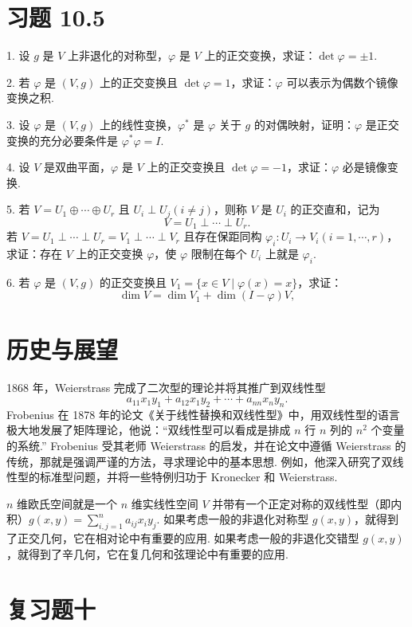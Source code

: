 \documentclass[UTF8,12pt,a4paper,fontset=fandol]{ctexart}
\begin{document}
\section*{习题 10.5}

1. 设 $g$ 是 $V$ 上非退化的对称型，$\varphi$ 是 $V$ 上的正交变换，求证：$\det\varphi=\pm1$.

2. 若 $\varphi$ 是 $(V,g)$ 上的正交变换且 $\det\varphi=1$，求证：$\varphi$ 可以表示为偶数个镜像变换之积.

3. 设 $\varphi$ 是 $(V,g)$ 上的线性变换，$\varphi^*$ 是 $\varphi$ 关于 $g$ 的对偶映射，证明：$\varphi$ 是正交变换的充分必要条件是 $\varphi^*\varphi=I$.

4. 设 $V$ 是双曲平面，$\varphi$ 是 $V$ 上的正交变换且 $\det\varphi=-1$，求证：$\varphi$ 必是镜像变换.

5. 若 $V=U_1\oplus\cdots\oplus U_r$ 且 $U_i\perp U_j(i\ne j)$，则称 $V$ 是 $U_i$ 的正交直和，记为
\[
  V=U_1\perp\cdots\perp U_r.
\]
若 $V=U_1\perp\cdots\perp U_r=V_1\perp\cdots\perp V_r$ 且存在保距同构 $\varphi_i:U_i\to V_i(i=1,\cdots,r)$，求证：存在 $V$ 上的正交变换 $\varphi$，使 $\varphi$ 限制在每个 $U_i$ 上就是 $\varphi_i$.

6. 若 $\varphi$ 是 $(V,g)$ 的正交变换且 $V_1=\{x\in V\mid \varphi(x)=x\}$，求证：
\[
  \dim V=\dim V_1+\dim(I-\varphi)V,
\]

\section*{历史与展望}

1868 年，Weierstrass 完成了二次型的理论并将其推广到双线性型
\[
  a_{11}x_1y_1+a_{12}x_1y_2+\cdots+a_{nn}x_ny_n.
\]
Frobenius 在 1878 年的论文《关于线性替换和双线性型》中，用双线性型的语言极大地发展了矩阵理论，他说：“双线性型可以看成是排成 $n$ 行 $n$ 列的 $n^2$ 个变量的系统.” Frobenius 受其老师 Weierstrass 的启发，并在论文中遵循 Weierstrass 的传统，那就是强调严谨的方法，寻求理论中的基本思想. 例如，他深入研究了双线性型的标准型问题，并将一些特例归功于 Kronecker 和 Weierstrass.

$n$ 维欧氏空间就是一个 $n$ 维实线性空间 $V$ 并带有一个正定对称的双线性型（即内积）$g(x,y)=\sum_{i,j=1}^n a_{ij}x_iy_j$. 如果考虑一般的非退化对称型 $g(x,y)$，就得到了正交几何，它在相对论中有重要的应用. 如果考虑一般的非退化交错型 $g(x,y)$，就得到了辛几何，它在复几何和弦理论中有重要的应用.

\section*{复习题十}
\end{document}
